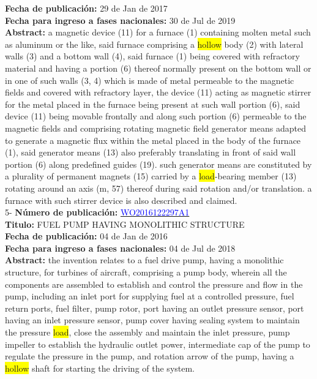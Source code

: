 \textbf{Fecha de publicación:} 29 de Jan de 2017\\ 
\textbf{Fecha para ingreso a fases nacionales:} 30 de Jul de 2019\\ 
\textbf{Abstract:} a magnetic device (11) for a furnace (1) containing molten metal such as aluminum or the like, said furnace comprising a \colorbox{yellow}{\colorbox{yellow}{hollow}} body (2) with lateral walls (3) and a bottom wall (4), said furnace (1) being covered with refractory material and having a portion (6) thereof normally present on the bottom wall or in one of such walls (3, 4) which is made of metal permeable to the magnetic fields and covered with refractory layer, the device (11) acting as magnetic stirrer for the metal placed in the furnace being present at such wall portion (6), said device (11) being movable frontally and along such portion (6) permeable to the magnetic fields and comprising rotating magnetic field generator means adapted to generate a magnetic flux within the metal placed in the body of the furnace (1), said generator means (13) also preferably translating in front of said wall portion (6) along predefined guides (19). such generator means are constituted by a plurality of permanent magnets (15) carried by a \colorbox{yellow}{\colorbox{yellow}{\colorbox{yellow}{load}}}-bearing member (13) rotating around an axis (m, 57) thereof during said rotation and/or translation. a furnace with such stirrer device is also described and claimed.\\ 
 

 \vspace{1cm}5- \textbf{Número de publicación:} \href{https://worldwide.espacenet.com/publicationDetails/biblio?DB=EPODOC&II=0&ND=3&adjacent=true&locale=en_EP&FT=D&date=20160331&CC=WO&NR=2016122297A1&KC=A1#}{\textcolor{blue}{WO2016122297A1}}\\ 
\textbf{Titulo:} FUEL PUMP HAVING MONOLITHIC STRUCTURE\\ 
 
\textbf{Fecha de publicación:} 04 de Jan de 2016\\ 
\textbf{Fecha para ingreso a fases nacionales:} 04 de Jul de 2018\\ 
\textbf{Abstract:} the invention relates to a fuel drive pump, having a monolithic structure, for turbines of aircraft, comprising a pump body, wherein all the components are assembled to establish and control the pressure and flow in the pump, including an inlet port for supplying fuel at a controlled pressure, fuel return ports, fuel filter, pump rotor, port having an outlet pressure sensor, port having an inlet pressure sensor, pump cover having sealing system to maintain the pressure \colorbox{yellow}{\colorbox{yellow}{\colorbox{yellow}{load}}}, close the assembly and maintain the inlet pressure, pump impeller to establish the hydraulic outlet power, intermediate cap of the pump to regulate the pressure in the pump, and rotation arrow of the pump, having a \colorbox{yellow}{\colorbox{yellow}{hollow}} shaft for starting the driving of the system.\\ 
 

